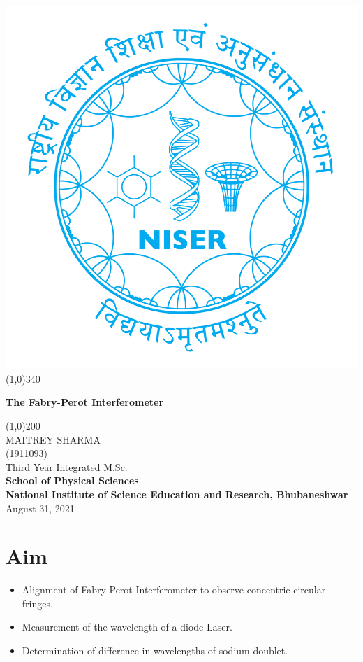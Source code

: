 \documentclass{article}
\begin{document}
\begin{titlepage}
\begin{center}
\includegraphics[scale=0.12]{document/niser.png}
\line(1,0){340}\\
[2mm]
\begin{large}
\textbf{\huge The Fabry-Perot Interferometer}\\ 
\end{large}
\line(1,0){200}\\
[5cm]
\large MAITREY SHARMA\\
\small (1911093)\\
[3.5cm]
Third Year Integrated M.Sc.\\
\textbf{School of Physical Sciences}\\
\textbf{National Institute of Science Education and Research, Bhubaneshwar}\\
\small August 31, 2021
\end{center} 
\end{titlepage}
\newpage
\section{Aim}
\begin{itemize}
    \item Alignment of Fabry-Perot Interferometer to observe concentric circular fringes.
    \item Measurement of the wavelength of a diode Laser.
    \item Determination of difference in wavelengths of sodium doublet.
\end{itemize}
\end{document}
